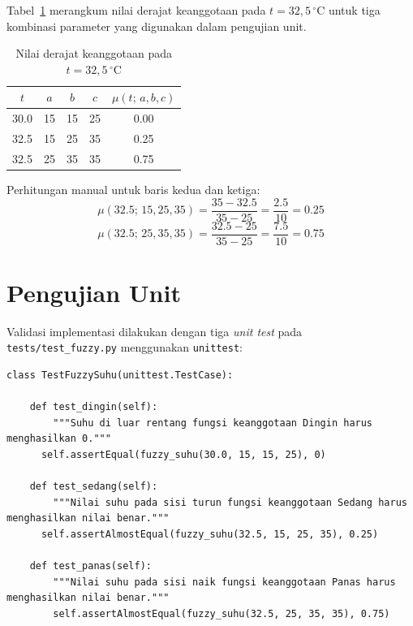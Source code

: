 \documentclass{article}
\begin{document}
Tabel~\ref{tab:verifikasi} merangkum nilai derajat keanggotaan pada $t = 32{,}5\,^{\circ}\mathrm{C}$
untuk tiga kombinasi parameter yang digunakan dalam pengujian unit.

\begin{table}[htbp]
  \centering
  \caption{Nilai derajat keanggotaan pada $t = 32{,}5\,^{\circ}\mathrm{C}$}
  \begin{tabular}{c c c c c}
    \toprule
    $t$ & $a$ & $b$ & $c$ & $\mu(t;\,a,b,c)$ \\
    \midrule
    30.0 & 15 & 15 & 25 & 0.00 \\
    32.5 & 15 & 25 & 35 & 0.25 \\
    32.5 & 25 & 35 & 35 & 0.75 \\
    \bottomrule
  \end{tabular}
  \label{tab:verifikasi}
\end{table}

Perhitungan manual untuk baris kedua dan ketiga:
\begin{equation}
  \mu(32.5;\, 15, 25, 35) = \frac{35 - 32.5}{35 - 25} = \frac{2.5}{10} = 0.25
\end{equation}
\begin{equation}
  \mu(32.5;\, 25, 35, 35) = \frac{32.5 - 25}{35 - 25} = \frac{7.5}{10} = 0.75
\end{equation}

\FloatBarrier
\section*{Pengujian Unit}
\FloatBarrier

Validasi implementasi dilakukan dengan tiga \textit{unit test} pada
\texttt{tests/test\_fuzzy.py} menggunakan \texttt{unittest}:

\begin{lstlisting}[style=python, caption={tests/test\_fuzzy.py -- unit test fungsi keanggotaan}]
class TestFuzzySuhu(unittest.TestCase):

    def test_dingin(self):
        """Suhu di luar rentang fungsi keanggotaan Dingin harus menghasilkan 0."""
      self.assertEqual(fuzzy_suhu(30.0, 15, 15, 25), 0)

    def test_sedang(self):
        """Nilai suhu pada sisi turun fungsi keanggotaan Sedang harus menghasilkan nilai benar."""
      self.assertAlmostEqual(fuzzy_suhu(32.5, 15, 25, 35), 0.25)

    def test_panas(self):
        """Nilai suhu pada sisi naik fungsi keanggotaan Panas harus menghasilkan nilai benar."""
        self.assertAlmostEqual(fuzzy_suhu(32.5, 25, 35, 35), 0.75)
\end{lstlisting}
\end{document}
